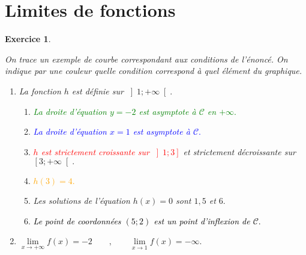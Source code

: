 \documentclass[10pt]{article}
\newtheorem{exo}{Exercice}
\begin{document}
\section{Limites de fonctions}



\begin{exo}

\begin{multicols}{2}
On trace un exemple de courbe correspondant aux conditions de l'énoncé. On indique par une couleur quelle condition correspond à quel élément du graphique.

\begin{enumerate}
\item \textcolor{blue!60!white}{La fonction $h$ est définie sur $\left]1;+\infty\right[.$}

\begin{enumerate}
\item \textcolor{green}{La droite d'équation $y=-2$ est asymptote à $\mathcal{C}$ en $+\infty.$}
\item \textcolor{blue}{La droite d'équation $x=1$ est asymptote à $\mathcal{C}.$}
\item \textcolor{red}{$h$ est strictement croissante sur $\left]1;3\right]$} et \textcolor{violet!50!blue}{strictement décroissante sur $\left[3;+\infty\right[.$}
\item \textcolor{orange}{$h(3)=4.$}
\item \textcolor{pink!20!magenta}{Les solutions de l'équation $h(x)=0$ sont $1,5$ et $6.$}
\item \textcolor{black}{Le point de coordonnées $(5;2)$ est un point d'inflexion de $\mathcal{C}.$}
\end{enumerate}


\item $\lim\limits_{x\to +\infty} f(x)=-2\qquad ,\qquad\lim\limits_{x\to 1} f(x)=-\infty.$
\end{enumerate}



\end{multicols}
\end{exo}
\end{document}

